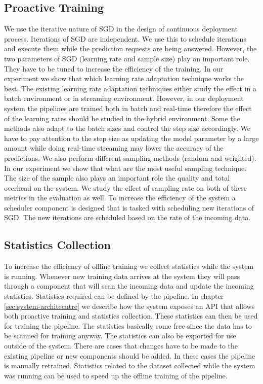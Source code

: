 \subsection{Proactive Training}
We use the iterative nature of SGD in the design of continuous deployment process.
Iterations of SGD are independent.
We use this to schedule iterations and execute them while the prediction requests are being answered.
However, the two parameters of SGD (learning rate and sample size) play an important role.
They have to be tuned to increase the efficiency of the training.
In our experiment we show that which learning rate adaptation technique works the best.
The existing learning rate adaptation techniques either study the effect in a batch environment or in streaming environment.
However, in our deployment system the pipelines are trained both in batch and real-time therefore the effect of the learning rates should be studied in the hybrid environment.
Some the methods also adapt to the batch sizes and control the step size accordingly.
We have to pay attention to the step size as updating the model parameter by a large amount while doing real-time streaming may lower the accuracy of the predictions.
We also perform different sampling methods (random and weighted).
In our experiment we show that what are the most useful sampling technique.
The size of the sample also plays an important role the quality and total overhead on the system.
We study the effect of sampling rate on both of these metrics in the evaluation as well.
To increase the efficiency of the system a scheduler component is designed that is tasked with scheduling new iterations of SGD.
The new iterations are scheduled based on the rate of the incoming data.


\subsection{Statistics Collection}
To increase the efficiency of offline training we collect statistics while the system is running.
Whenever new training data arrives at the system they will pass through a component that will scan the incoming data and update the incoming statistics.
Statistics required can be defined by the pipeline.
In chapter \ref{sec:system-architecutre} we describe how the system exposes an API that allows both proactive training and statistics collection.
These statistics can then be used for training the pipeline.
The statistics basically come free since the data has to be scanned for training anyway.
The statistics can also be exported for use outside of the system.
There are cases that changes have to be made to the existing pipeline or new components should be added.
In these cases the pipeline is manually retrained.
Statistics related to the dataset collected while the system was running can be used to speed up the offline training of the pipeline.

